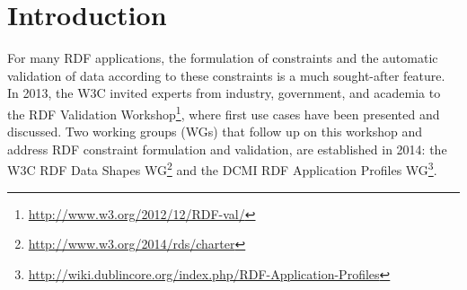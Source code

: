 \documentclass{llncs}
\begin{document}
%
%

\section{Introduction}

For many RDF applications, the formulation of constraints and the automatic validation of data according to these constraints is a much sought-after feature. 
In 2013, the W3C invited experts from industry, government, and academia to the RDF Validation Workshop\footnote{\url{http://www.w3.org/2012/12/RDF-val/}}, 
where first use cases have been presented and discussed. 
Two working groups (WGs) that follow up on this workshop and address RDF constraint formulation and validation, are established in 2014: 
the W3C RDF Data Shapes WG\footnote{\url{http://www.w3.org/2014/rds/charter}} and the DCMI RDF Application Profiles WG\footnote{\url{http://wiki.dublincore.org/index.php/RDF-Application-Profiles}}. 
\end{document}

